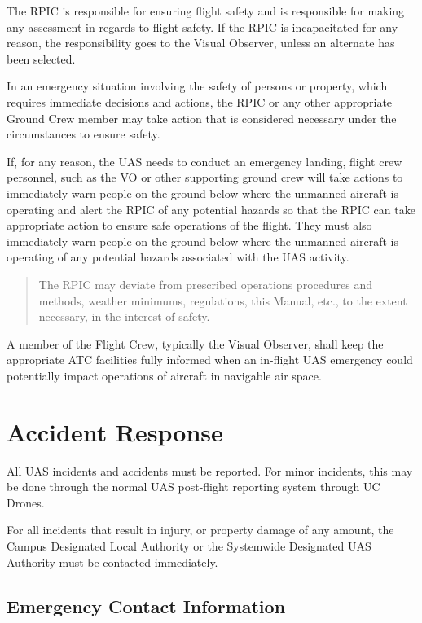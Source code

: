 \documentclass[
]{book}
\begin{document}
The RPIC is responsible for ensuring flight safety and is responsible for making any assessment in regards to flight safety. If the RPIC is incapacitated for any reason, the responsibility goes to the Visual Observer, unless an alternate has been selected.

In an emergency situation involving the safety of persons or property, which requires immediate decisions and actions, the RPIC or any other appropriate Ground Crew member may take action that is considered necessary under the circumstances to ensure safety.

If, for any reason, the UAS needs to conduct an emergency landing, flight crew personnel, such as the VO or other supporting ground crew will take actions to immediately warn people on the ground below where the unmanned aircraft is operating and alert the RPIC of any potential hazards so that the RPIC can take appropriate action to ensure safe operations of the flight. They must also immediately warn people on the ground below where the unmanned aircraft is operating of any potential hazards associated with the UAS activity.

\begin{quote}
The RPIC may deviate from prescribed operations procedures and methods, weather minimums, regulations, this Manual, etc., to the extent necessary, in the interest of safety.
\end{quote}

A member of the Flight Crew, typically the Visual Observer, shall keep the appropriate ATC facilities fully informed when an in-flight UAS emergency could potentially impact operations of aircraft in navigable air space.

\hypertarget{accident-response}{%
\chapter{Accident Response}\label{accident-response}}

All UAS incidents and accidents must be reported. For minor incidents, this may be done through the normal UAS post-flight reporting system through UC Drones.

For all incidents that result in injury, or property damage of any amount, the Campus Designated Local Authority or the Systemwide Designated UAS Authority must be contacted immediately.

\hypertarget{emergency-contact-information}{%
\section{Emergency Contact Information}\label{emergency-contact-information}}
\end{document}
